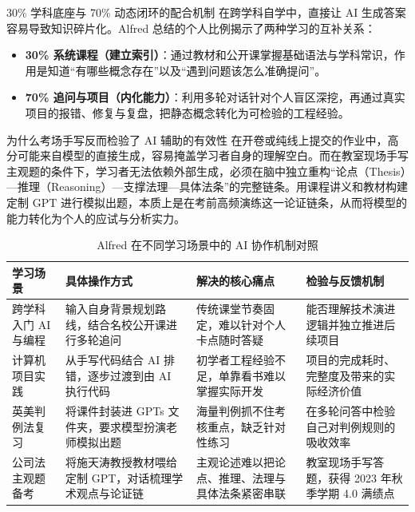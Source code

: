 \documentclass[UTF8,a4paper,11pt,fontset=fandol]{ctexart}
\begin{document}
\begin{knowledgebox}{30\% 学科底座与 70\% 动态闭环的配合机制}
在跨学科自学中，直接让 AI 生成答案容易导致知识碎片化。Alfred 总结的个人比例揭示了两种学习的互补关系：
\begin{itemize}
\item \textbf{30\% 系统课程（建立索引）}：通过教材和公开课掌握基础语法与学科常识，作用是知道“有哪些概念存在”以及“遇到问题该怎么准确提问”。
\item \textbf{70\% 追问与项目（内化能力）}：利用多轮对话针对个人盲区深挖，再通过真实项目的报错、修复与复盘，把静态概念转化为可检验的工程经验。
\end{itemize}
\end{knowledgebox}
\begin{importantbox}{为什么考场手写反而检验了 AI 辅助的有效性}
在开卷或纯线上提交的作业中，高分可能来自模型的直接生成，容易掩盖学习者自身的理解空白。而在教室现场手写主观题的条件下，学习者无法依赖外部生成，必须在脑中独立重构“论点（Thesis）—推理（Reasoning）—支撑法理—具体法条”的完整链条。用课程讲义和教材构建定制 GPT 进行模拟出题，本质上是在考前高频演练这一论证链条，从而将模型的能力转化为个人的应试与分析实力。
\end{importantbox}
\begin{table}[H]\centering\small
\caption{Alfred 在不同学习场景中的 AI 协作机制对照}
\begin{tabular}{>{\raggedright\arraybackslash}p{\dimexpr(\linewidth-8\tabcolsep)/4\relax}>{\raggedright\arraybackslash}p{\dimexpr(\linewidth-8\tabcolsep)/4\relax}>{\raggedright\arraybackslash}p{\dimexpr(\linewidth-8\tabcolsep)/4\relax}>{\raggedright\arraybackslash}p{\dimexpr(\linewidth-8\tabcolsep)/4\relax}}
\toprule
学习场景 & 具体操作方式 & 解决的核心痛点 & 检验与反馈机制\\\midrule
跨学科入门 AI 与编程 & 输入自身背景规划路线，结合名校公开课进行多轮追问 & 传统课堂节奏固定，难以针对个人卡点随时答疑 & 能否理解技术演进逻辑并独立推进后续项目\\[4pt]
计算机项目实践 & 从手写代码结合 AI 排错，逐步过渡到由 AI 执行代码 & 初学者工程经验不足，单靠看书难以掌握实际开发 & 项目的完成耗时、完整度及带来的实际经济价值\\[4pt]
英美判例法复习 & 将课件封装进 GPTs 文件夹，要求模型扮演老师模拟出题 & 海量判例抓不住考核重点，缺乏针对性练习 & 在多轮问答中检验自己对判例规则的吸收效率\\[4pt]
公司法主观题备考 & 将施天涛教授教材喂给定制 GPT，对话梳理学术观点与论证链 & 主观论述难以把论点、推理、法理与具体法条紧密串联 & 教室现场手写答题，获得 2023 年秋季学期 4.0 满绩点\\[4pt]
\bottomrule\end{tabular}\end{table}
\end{document}
